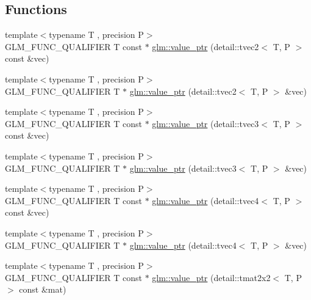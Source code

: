 \subsection*{Functions}
\begin{DoxyCompactItemize}
\item 
{\footnotesize template$<$typename T , precision P$>$ }\\G\-L\-M\-\_\-\-F\-U\-N\-C\-\_\-\-Q\-U\-A\-L\-I\-F\-I\-E\-R T const $\ast$ \hyperlink{group__gtc__type__ptr_gac57a976f59e794e6406ecf2924a18f4e}{glm\-::value\-\_\-ptr} (detail\-::tvec2$<$ T, P $>$ const \&vec)
\item 
{\footnotesize template$<$typename T , precision P$>$ }\\G\-L\-M\-\_\-\-F\-U\-N\-C\-\_\-\-Q\-U\-A\-L\-I\-F\-I\-E\-R T $\ast$ \hyperlink{group__gtc__type__ptr_gac2a64387090621acf7176b63f31b70a2}{glm\-::value\-\_\-ptr} (detail\-::tvec2$<$ T, P $>$ \&vec)
\item 
{\footnotesize template$<$typename T , precision P$>$ }\\G\-L\-M\-\_\-\-F\-U\-N\-C\-\_\-\-Q\-U\-A\-L\-I\-F\-I\-E\-R T const $\ast$ \hyperlink{group__gtc__type__ptr_ga676a0ba6f4b7cd817fe6d16cb3113857}{glm\-::value\-\_\-ptr} (detail\-::tvec3$<$ T, P $>$ const \&vec)
\item 
{\footnotesize template$<$typename T , precision P$>$ }\\G\-L\-M\-\_\-\-F\-U\-N\-C\-\_\-\-Q\-U\-A\-L\-I\-F\-I\-E\-R T $\ast$ \hyperlink{group__gtc__type__ptr_ga4babc9956e32bbd0769bc20ab2d73800}{glm\-::value\-\_\-ptr} (detail\-::tvec3$<$ T, P $>$ \&vec)
\item 
{\footnotesize template$<$typename T , precision P$>$ }\\G\-L\-M\-\_\-\-F\-U\-N\-C\-\_\-\-Q\-U\-A\-L\-I\-F\-I\-E\-R T const $\ast$ \hyperlink{group__gtc__type__ptr_ga6963deec2c77b8a49b3f7e434914f6ba}{glm\-::value\-\_\-ptr} (detail\-::tvec4$<$ T, P $>$ const \&vec)
\item 
{\footnotesize template$<$typename T , precision P$>$ }\\G\-L\-M\-\_\-\-F\-U\-N\-C\-\_\-\-Q\-U\-A\-L\-I\-F\-I\-E\-R T $\ast$ \hyperlink{group__gtc__type__ptr_gaa3ed69a05293987972b589311e5feb23}{glm\-::value\-\_\-ptr} (detail\-::tvec4$<$ T, P $>$ \&vec)
\item 
{\footnotesize template$<$typename T , precision P$>$ }\\G\-L\-M\-\_\-\-F\-U\-N\-C\-\_\-\-Q\-U\-A\-L\-I\-F\-I\-E\-R T const $\ast$ \hyperlink{group__gtc__type__ptr_ga013fcf415d78cc3aa9273c5d4f780325}{glm\-::value\-\_\-ptr} (detail\-::tmat2x2$<$ T, P $>$ const \&mat)

\end{DoxyCompactItemize}
